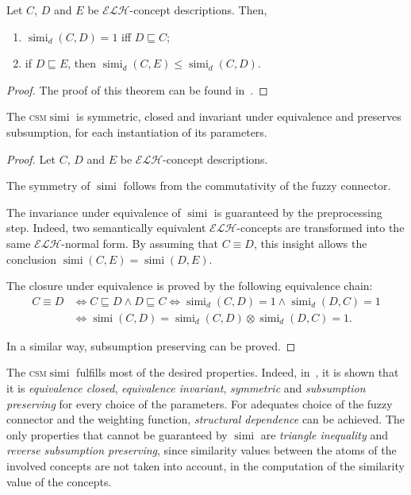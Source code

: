 \documentclass[]{llncs}
\DeclareMathOperator{\simi}{simi}
\newcommand{\elh}{\(\mathcal{ELH}\)\xspace}
\newcommand{\csm}{\textsc{csm}\xspace}
\begin{document}
  \begin{lemma}
    Let \(C\), \(D\) and \(E\) be \elh-concept descriptions.
    Then,
    \begin{enumerate}
      \item \(\simi_d(C,D) = 1\) iff \(D \sqsubseteq C\);
      \item if \(D \sqsubseteq E\), then \(\simi_d(C,E) \le \simi_d(C,D)\).
    \end{enumerate}
  \end{lemma}
  \begin{proof}
    The proof of this theorem can be found in~\cite{LeTu12}.
  \end{proof}
  \begin{theorem}
    The \csm \(\simi\) is symmetric, closed and invariant under equivalence and preserves subsumption, for each instantiation of its parameters.
  \end{theorem}
  \begin{proof}
    Let \(C\), \(D\) and \(E\) be \elh-concept descriptions.

    The symmetry of \(\simi\) follows from the commutativity of the fuzzy connector.

    The invariance under equivalence of \(\simi\) is guaranteed by the preprocessing step.
    Indeed, two semantically equivalent \elh-concepts are transformed into the same \elh-normal form.
    By assuming that \(C \equiv D\), this insight allows the conclusion \(\simi(C,E) = \simi(D,E)\).

    The closure under equivalence is proved by the following equivalence chain:
    \begin{equation*}
      \begin{split}
        C \equiv D &\iff C \sqsubseteq D \land D \sqsubseteq C \iff
        \simi_d(C,D) = 1 \land \simi_d(D,C) = 1 \\ &\iff
        \simi(C,D) = \simi_d(C,D) \otimes \simi_d(D,C) = 1.
      \end{split}
    \end{equation*}

    In a similar way, subsumption preserving can be proved.
  \end{proof}
  The \csm \(\simi\) fulfills most of the desired properties.
  Indeed, in~\cite{LeTu12}, it is shown that it is \emph{equivalence closed}, \emph{equivalence invariant}, \emph{symmetric} and \emph{subsumption preserving} for every choice of the parameters.
  For adequates choice of the fuzzy connector and the weighting function, \emph{structural dependence} can be achieved.
  The only properties that cannot be guaranteed by \(\simi\) are \emph{triangle inequality} and \emph{reverse subsumption preserving}, since similarity values between the atoms of the involved concepts are not taken into account, in the computation of the similarity value of the concepts.
\end{document}
